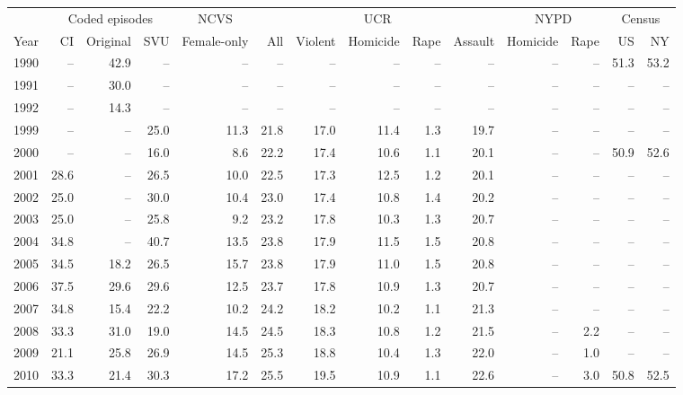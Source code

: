 \begin{center}
\label{tab:c_sex}
\small
\setlength{\tabcolsep}{2.5pt}
\renewcommand{\arraystretch}{1.08}
\begin{tabular}{@{}rrrrrrrrrrrrrr@{}}
\toprule
 & \multicolumn{3}{c}{Coded episodes} & \multicolumn{1}{c}{NCVS} & \multicolumn{5}{c}{UCR} & \multicolumn{2}{c}{NYPD} & \multicolumn{2}{c}{Census} \\
\cmidrule(lr){2-4}
\cmidrule(lr){5-5}
\cmidrule(lr){6-10}
\cmidrule(lr){11-12}
\cmidrule(lr){13-14}
Year & CI & Original & SVU & Female-only & All & Violent & Homicide & Rape & Assault & Homicide & Rape & US & NY \\
\midrule
1990 & -- & 42.9 & -- & -- & -- & -- & -- & -- & -- & -- & -- & 51.3 & 53.2 \\
1991 & -- & 30.0 & -- & -- & -- & -- & -- & -- & -- & -- & -- & -- & -- \\
1992 & -- & 14.3 & -- & -- & -- & -- & -- & -- & -- & -- & -- & -- & -- \\
1999 & -- & -- & 25.0 & 11.3 & 21.8 & 17.0 & 11.4 & 1.3 & 19.7 & -- & -- & -- & -- \\
2000 & -- & -- & 16.0 & 8.6 & 22.2 & 17.4 & 10.6 & 1.1 & 20.1 & -- & -- & 50.9 & 52.6 \\
2001 & 28.6 & -- & 26.5 & 10.0 & 22.5 & 17.3 & 12.5 & 1.2 & 20.1 & -- & -- & -- & -- \\
2002 & 25.0 & -- & 30.0 & 10.4 & 23.0 & 17.4 & 10.8 & 1.4 & 20.2 & -- & -- & -- & -- \\
2003 & 25.0 & -- & 25.8 & 9.2 & 23.2 & 17.8 & 10.3 & 1.3 & 20.7 & -- & -- & -- & -- \\
2004 & 34.8 & -- & 40.7 & 13.5 & 23.8 & 17.9 & 11.5 & 1.5 & 20.8 & -- & -- & -- & -- \\
2005 & 34.5 & 18.2 & 26.5 & 15.7 & 23.8 & 17.9 & 11.0 & 1.5 & 20.8 & -- & -- & -- & -- \\
2006 & 37.5 & 29.6 & 29.6 & 12.5 & 23.7 & 17.8 & 10.9 & 1.3 & 20.7 & -- & -- & -- & -- \\
2007 & 34.8 & 15.4 & 22.2 & 10.2 & 24.2 & 18.2 & 10.2 & 1.1 & 21.3 & -- & -- & -- & -- \\
2008 & 33.3 & 31.0 & 19.0 & 14.5 & 24.5 & 18.3 & 10.8 & 1.2 & 21.5 & -- & 2.2 & -- & -- \\
2009 & 21.1 & 25.8 & 26.9 & 14.5 & 25.3 & 18.8 & 10.4 & 1.3 & 22.0 & -- & 1.0 & -- & -- \\
2010 & 33.3 & 21.4 & 30.3 & 17.2 & 25.5 & 19.5 & 10.9 & 1.1 & 22.6 & -- & 3.0 & 50.8 & 52.5 \\

\end{tabular}
\end{center}
